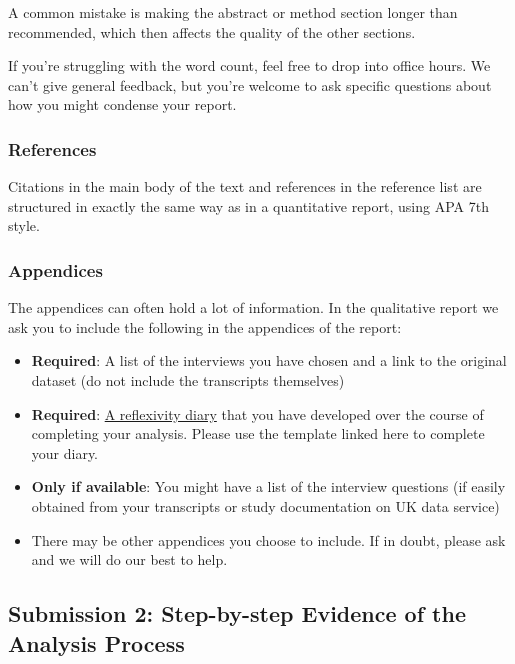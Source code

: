 \documentclass[
  english,
  letterpaper,
  DIV=11,
  numbers=noendperiod]{scrreprt}
\providecommand{\tightlist}{%
  \setlength{\itemsep}{0pt}\setlength{\parskip}{0pt}}
\begin{document}
A common mistake is making the abstract or method section longer than
recommended, which then affects the quality of the other sections.

If you're struggling with the word count, feel free to drop into office
hours. We can't give general feedback, but you're welcome to ask
specific questions about how you might condense your report.

\subsubsection{References}\label{references}

Citations in the main body of the text and references in the reference
list are structured in exactly the same way as in a quantitative report,
using APA 7th style.

\subsubsection{Appendices}\label{appendices}

The appendices can often hold a lot of information. In the qualitative
report we ask you to include the following in the appendices of the
report:

\begin{itemize}
\tightlist
\item
  \textbf{Required}: A list of the interviews you have chosen and a link
  to the original dataset (do not include the transcripts themselves)
\item
  \textbf{Required}:
  \href{https://gla-my.sharepoint.com/:w:/g/personal/ashley_robertson_glasgow_ac_uk/IQC1PIxhBlndR74S_nfeKHNlAW5uQmGOpoRXCpLHC2fI_fI?e=aunShJ}{A
  reflexivity diary} that you have developed over the course of
  completing your analysis. Please use the template linked here to
  complete your diary.
\item
  \textbf{Only if available}: You might have a list of the interview
  questions (if easily obtained from your transcripts or study
  documentation on UK data service)
\item
  There may be other appendices you choose to include. If in doubt,
  please ask and we will do our best to help.
\end{itemize}

\subsection{Submission 2: Step-by-step Evidence of the Analysis
Process}\label{submission-2-step-by-step-evidence-of-the-analysis-process}
\end{document}

